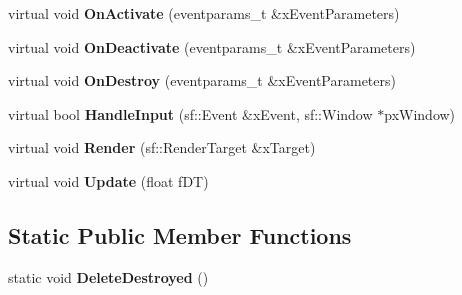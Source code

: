 \begin{DoxyCompactItemize}
\item 
\hypertarget{class_k_g_e_1_1_component_a345806a8602e41e704691f22cfe01dcf}{virtual void {\bfseries On\-Activate} (eventparams\-\_\-t \&x\-Event\-Parameters)}\label{class_k_g_e_1_1_component_a345806a8602e41e704691f22cfe01dcf}

\item 
\hypertarget{class_k_g_e_1_1_component_a9c89319c75b7c01ff870019458f35e68}{virtual void {\bfseries On\-Deactivate} (eventparams\-\_\-t \&x\-Event\-Parameters)}\label{class_k_g_e_1_1_component_a9c89319c75b7c01ff870019458f35e68}

\item 
\hypertarget{class_k_g_e_1_1_component_a55fb5a2d3d18b32c06e5d09ede54e4a9}{virtual void {\bfseries On\-Destroy} (eventparams\-\_\-t \&x\-Event\-Parameters)}\label{class_k_g_e_1_1_component_a55fb5a2d3d18b32c06e5d09ede54e4a9}

\item 
\hypertarget{class_k_g_e_1_1_component_a465878aacc4cc7a260e87379a3803850}{virtual bool {\bfseries Handle\-Input} (sf\-::\-Event \&x\-Event, sf\-::\-Window $\ast$px\-Window)}\label{class_k_g_e_1_1_component_a465878aacc4cc7a260e87379a3803850}

\item 
\hypertarget{class_k_g_e_1_1_component_a4e038c491b68883684e135d4fa9431c4}{virtual void {\bfseries Render} (sf\-::\-Render\-Target \&x\-Target)}\label{class_k_g_e_1_1_component_a4e038c491b68883684e135d4fa9431c4}

\item 
\hypertarget{class_k_g_e_1_1_component_a07e34baf1f9fd29c92e08ded0ad5a798}{virtual void {\bfseries Update} (float f\-D\-T)}\label{class_k_g_e_1_1_component_a07e34baf1f9fd29c92e08ded0ad5a798}

\end{DoxyCompactItemize}
\subsection*{Static Public Member Functions}
\begin{DoxyCompactItemize}
\item 
\hypertarget{class_k_g_e_1_1_component_afe843250d8c92a3f963af549e2bd449d}{static void {\bfseries Delete\-Destroyed} ()}\label{class_k_g_e_1_1_component_afe843250d8c92a3f963af549e2bd449d}

\end{DoxyCompactItemize}
